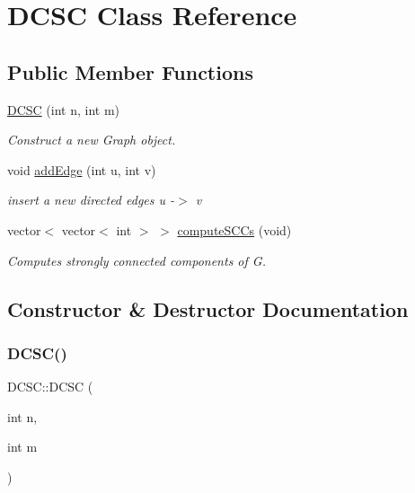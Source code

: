 \hypertarget{classDCSC}{}\section{D\+C\+SC Class Reference}
\label{classDCSC}
\subsection*{Public Member Functions}
\begin{DoxyCompactItemize}
\item 
\mbox{\hyperlink{classDCSC_a9d23a63eca7b3007daa3e1c6f6a61f2c}{D\+C\+SC}} (int n, int m)
\begin{DoxyCompactList}\small\item\em Construct a new Graph object. \end{DoxyCompactList}\item 
void \mbox{\hyperlink{classDCSC_ac971c9c7f4b35eebaab12f9dc399e260}{add\+Edge}} (int u, int v)
\begin{DoxyCompactList}\small\item\em insert a new directed edges u -\/$>$ v \end{DoxyCompactList}\item 
vector$<$ vector$<$ int $>$ $>$ \mbox{\hyperlink{classDCSC_a287ebcdb5c7588d274e0b9574af0451e}{compute\+S\+C\+Cs}} (void)
\begin{DoxyCompactList}\small\item\em Computes strongly connected components of G. \end{DoxyCompactList}\end{DoxyCompactItemize}


\subsection{Constructor \& Destructor Documentation}
\mbox{\label{classDCSC_a9d23a63eca7b3007daa3e1c6f6a61f2c}} 
\subsubsection{\texorpdfstring{D\+C\+S\+C()}{DCSC()}}
{\footnotesize\ttfamily D\+C\+S\+C\+::\+D\+C\+SC (\begin{DoxyParamCaption}\item[{int}]{n,  }\item[{int}]{m }\end{DoxyParamCaption})}



